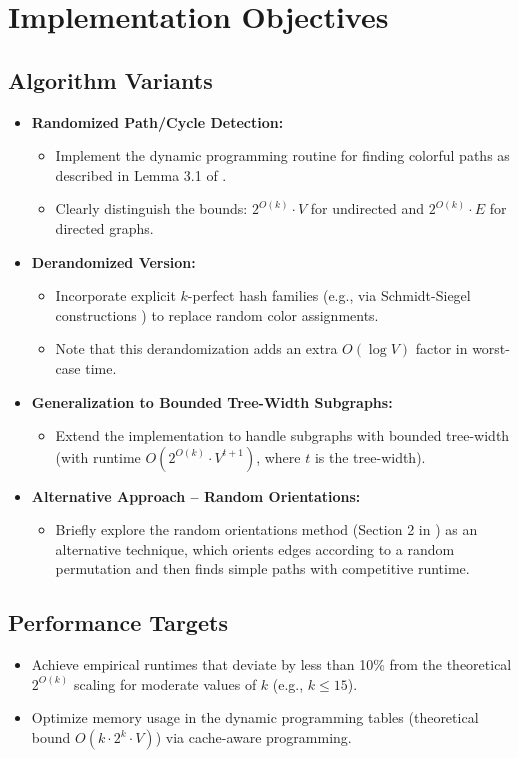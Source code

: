 \section{Implementation Objectives}
\subsection{Algorithm Variants}
\begin{itemize}
    \item \textbf{Randomized Path/Cycle Detection:}
    \begin{itemize}
        \item Implement the dynamic programming routine for finding colorful paths as described in Lemma 3.1 of \cite{alon1995color}.
        \item Clearly distinguish the bounds: \(2^{O(k)} \cdot V\) for undirected and \(2^{O(k)} \cdot E\) for directed graphs.
    \end{itemize}
    \item \textbf{Derandomized Version:}
    \begin{itemize}
        \item Incorporate explicit \(k\)-perfect hash families (e.g., via Schmidt-Siegel constructions \cite{schmidt1990spatial}) to replace random color assignments.
        \item Note that this derandomization adds an extra \(O(\log V)\) factor in worst-case time.
    \end{itemize}
    \item \textbf{Generalization to Bounded Tree-Width Subgraphs:}
    \begin{itemize}
        \item Extend the implementation to handle subgraphs with bounded tree-width (with runtime \(O(2^{O(k)} \cdot V^{t+1})\), where \(t\) is the tree-width).
    \end{itemize}
    \item \textbf{Alternative Approach -- Random Orientations:}
    \begin{itemize}
        \item Briefly explore the random orientations method (Section 2 in \cite{alon1995color}) as an alternative technique, which orients edges according to a random permutation and then finds simple paths with competitive runtime.
    \end{itemize}
\end{itemize}

\subsection{Performance Targets}
\begin{itemize}
    \item Achieve empirical runtimes that deviate by less than 10\% from the theoretical \(2^{O(k)}\) scaling for moderate values of \(k\) (e.g., \(k \leq 15\)).
    \item Optimize memory usage in the dynamic programming tables (theoretical bound \(O(k \cdot 2^k \cdot V)\)) via cache-aware programming.
\end{itemize}

